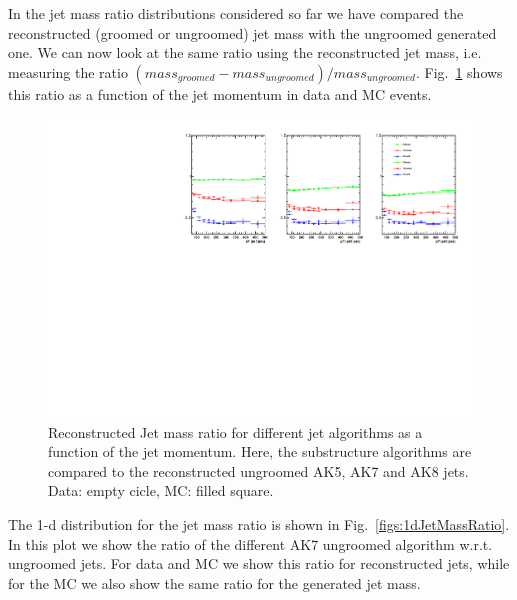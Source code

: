 In the jet mass ratio distributions considered so far we have compared the reconstructed (groomed or ungroomed) jet mass with the ungroomed generated one. We can now look at the same ratio using the reconstructed jet mass, i.e. measuring the ratio $(mass_{groomed} - mass_{ungroomed})/mass_{ungroomed}$. Fig.~\ref{figs:massRatioData} shows this ratio as a function of the jet momentum in data and MC events.

\begin{figure}[!htb]
\centering
\includegraphics[width=1.0\textwidth]
{figs/massRatioOvReco_vsPt.pdf}
\caption{Reconstructed Jet mass ratio for different jet algorithms as a function of the jet momentum. 
Here, the substructure algorithms are compared to the
  reconstructed ungroomed AK5, AK7 and AK8 jets. Data: empty cicle, MC: filled square.}
\label{figs:massRatioData}
\end{figure}
     
The 1-d distribution for the jet mass ratio is shown in Fig.~\ref{figs:1dJetMassRatio}. In this plot we show the ratio of the different AK7 ungroomed algorithm w.r.t. ungroomed jets. For data and MC we show this ratio for reconstructed jets, while for the MC we also show the same ratio for the generated jet mass.   

